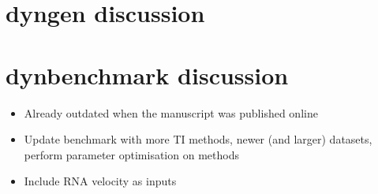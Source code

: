 
%

%

\section{dyngen discussion}

\section{dynbenchmark discussion}
\begin{itemize}
	\item Already outdated when the manuscript was published online
	\item Update benchmark with more TI methods, newer (and larger) datasets, perform parameter optimisation on methods
	\item Include RNA velocity as inputs
\end{itemize}

